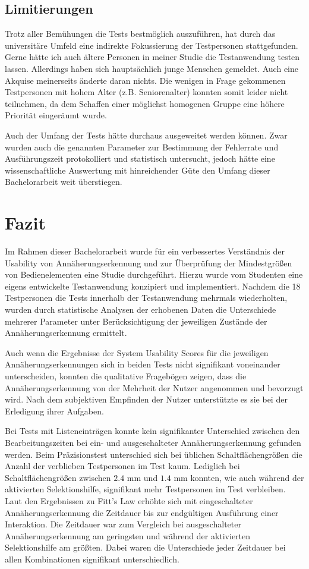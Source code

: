 \documentclass[12pt,bibliography=totocnumbered,listof=totocnumbered,abstracton]{scrreprt}
\begin{document}
\section{Limitierungen}
Trotz aller Bemühungen die Tests bestmöglich auszuführen, hat durch das universitäre Umfeld eine indirekte Fokussierung der Testpersonen stattgefunden. Gerne hätte ich auch ältere Personen in meiner Studie die Testanwendung testen lassen. Allerdings haben sich hauptsächlich junge Menschen gemeldet. Auch eine Akquise meinerseits änderte daran nichts. Die wenigen in Frage gekommenen Testpersonen mit hohem Alter (z.B. Seniorenalter) konnten somit leider nicht teilnehmen, da dem Schaffen einer möglichst homogenen Gruppe eine höhere Priorität eingeräumt wurde.

Auch der Umfang der Tests hätte durchaus ausgeweitet werden können. Zwar wurden auch die genannten Parameter zur Bestimmung der Fehlerrate und Ausführungszeit protokolliert und statistisch untersucht, jedoch hätte eine wissenschaftliche Auswertung mit hinreichender Güte den Umfang dieser Bachelorarbeit weit überstiegen.

\chapter{Fazit}
Im Rahmen dieser Bachelorarbeit wurde für ein verbessertes Verständnis der Usability von Annäherungserkennung und zur Überprüfung der Mindestgrößen von Bedienelementen eine Studie durchgeführt. Hierzu wurde vom Studenten eine eigens entwickelte Testanwendung konzipiert und implementiert. Nachdem die 18 Testpersonen die Tests innerhalb der Testanwendung mehrmals wiederholten, wurden durch statistische Analysen der erhobenen Daten die Unterschiede mehrerer Parameter unter Berücksichtigung der jeweiligen Zustände der Annäherungserkennung ermittelt.

Auch wenn die Ergebnisse der System Usability Scores für die jeweiligen Annäherungserkennungen sich in beiden Tests nicht signifikant voneinander unterscheiden, konnten die qualitative Fragebögen zeigen, dass die Annäherungserkennung von der Mehrheit der Nutzer angenommen und bevorzugt wird. Nach dem subjektiven Empfinden der Nutzer unterstützte es sie bei der Erledigung ihrer Aufgaben.

Bei Tests mit Listeneinträgen konnte kein signifikanter Unterschied zwischen den Bearbeitungszeiten bei ein- und ausgeschalteter Annäherungserkennung gefunden werden. Beim Präzisionstest unterschied sich bei üblichen Schaltflächengrößen die Anzahl der verblieben Testpersonen im Test kaum. Lediglich bei Schaltflächengrößen zwischen $2.4$ mm und $1.4$ mm konnten, wie auch während der aktivierten Selektionshilfe, signifikant mehr Testpersonen im Test verbleiben. Laut den Ergebnissen zu Fitt's Law erhöhte sich mit eingeschalteter Annäherungserkennung die Zeitdauer bis zur endgültigen Ausführung einer Interaktion. Die Zeitdauer war zum Vergleich bei ausgeschalteter Annäherungserkennung am geringsten und während der aktivierten Selektionshilfe am größten. Dabei waren die Unterschiede jeder Zeitdauer bei allen Kombinationen signifikant unterschiedlich.
\end{document}
